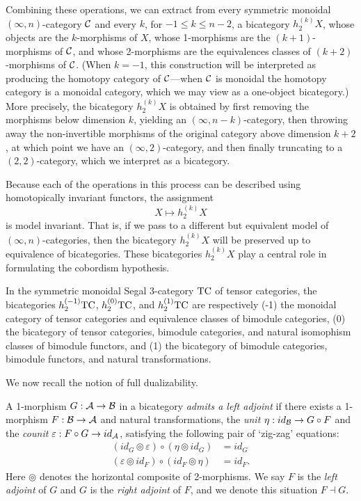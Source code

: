 \documentclass{amsart}
\begin{document}
Combining these operations, we can extract from every symmetric monoidal $(\infty,n)$-category $\mathcal C$ and every $k$, for $-1 \leq k \leq n-2$, a bicategory $h^{(k)}_2 X$, whose objects are the $k$-morphisms of $X$, whose 1-morphisms are the $(k+1)$-morphisms of $\mathcal C$, and whose 2-morphisms are the equivalences classes of $(k+2)$-morphisms of $\mathcal C$. (When $k=-1$, this construction will be interpreted as producing the homotopy category of $\mathcal C$---when $\mathcal C$ is monoidal the homotopy category is a monoidal category, which we may view as a one-object bicategory.)  More precisely, the bicategory $h^{(k)}_2 X$ is obtained by first removing the morphisms below dimension $k$, yielding an $(\infty,n-k)$-category, then throwing away the non-invertible morphisms of the original category above dimension $k+2$, at which point we have an $(\infty,2)$-category, and then finally truncating to a $(2,2)$-category, which we interpret as a bicategory. 

Because each of the operations in this process can be described using homotopically invariant functors, the assignment
\begin{equation*}
	X \mapsto h^{(k)}_2 X
\end{equation*}
is model invariant. That is, if we pass to a different but equivalent model of $(\infty,n)$-categories, then the bicategory  $h^{(k)}_2 X$ will be preserved up to equivalence of bicategories. These bicategories $h^{(k)}_2 X$ play a central role in formulating the cobordism hypothesis.

\begin{example}
	In the symmetric monoidal Segal 3-category $\mathrm{TC}$ of tensor categories, the bicategories $h^{(-1)}_2 \mathrm{TC}$, $h^{(0)}_2 \mathrm{TC}$, and $h^{(1)}_2 \mathrm{TC}$ are respectively (-1) the monoidal category of tensor categories and equivalence classes of bimodule categories, (0) the bicategory of tensor categories, bimodule categories, and natural isomophism classes of bimodule functors, and (1) the bicategory of bimodule categories, bimodule functors, and natural transformations.
\end{example}

We now recall the notion of full dualizability.

\begin{definition} \label{def:adjoints_in_bicat}
		A 1-morphism $G: \mathcal A \to \mathcal B$ in a bicategory {\em admits a left adjoint} if there exists a 1-morphism $F: \mathcal B \to \mathcal A$ and natural transformations, the {\em unit} $\eta: id_{\mathcal B} \to G \circ F$ and the {\em counit} $\varepsilon: F \circ G \to id_{\mathcal A}$, satisfying the following pair of `zig-zag' equations:
		\begin{align*}
			(id_{G} \circledcirc \varepsilon  ) \circ (  \eta \circledcirc id_{G}) &= id_{G} \\
			(\varepsilon \circledcirc id_{F}) \circ (id_{F} \circledcirc \eta) &= id_{F}.
		\end{align*}
	Here $\circledcirc$ denotes the horizontal composite of 2-morphisms.
	We say $F$ is the {\em left adjoint} of $G$ and $G$ is the {\em right adjoint} of $F$, and we denote this situation $F \dashv G$.
\end{definition}
\end{document}
